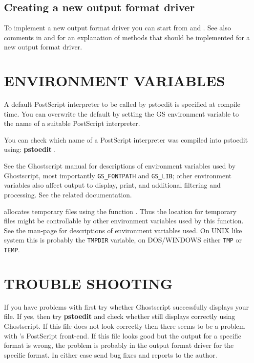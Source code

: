 \documentclass[english,a4paper]{article}
\begin{document}
  \subsection{Creating a new output format driver}
    To implement a new output format driver you can start from  and
    . See also comments in  and
     for an explanation of methods that should be implemented
    for a new output format driver.


\section{ENVIRONMENT VARIABLES}

A default PostScript interpreter to be called by pstoedit is specified at
compile time. You can overwrite the default by setting the GS environment
variable to the name of a suitable PostScript interpreter.

You can check which name of a PostScript interpreter was compiled into
pstoedit using: \textbf{pstoedit} .

See the Ghostscript manual for descriptions of environment variables used by
Ghostscript, most importantly \verb+GS_FONTPATH+ and \verb+GS_LIB+; other
environment variables also affect output to display, print, and additional
filtering and processing. See the related documentation.

 allocates temporary files using the function .
Thus the location for temporary files might be controllable by other
environment variables used by this function. See the  man-page
for descriptions of environment variables used. On UNIX like system this is
probably the \verb+TMPDIR+ variable, on DOS/WINDOWS either \verb+TMP+ or
\verb+TEMP+.

\section{TROUBLE SHOOTING}

If you have problems with  first try whether Ghostscript
successfully displays your file. If yes, then try
\textbf{pstoedit}   
and check whether  still displays correctly using
Ghostscript. If this file does not look correctly then there seems to be a
problem with 's PostScript front-end. If this file looks good
but the output for a specific format is wrong, the problem is probably in
the output format driver for the specific format. In either case send bug fixes and
reports to the author.
\end{document}
